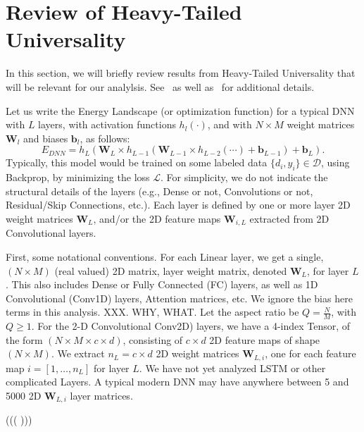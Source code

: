 
\section{Review of Heavy-Tailed Universality}
\label{sxn:theory-review}

In this section, we will briefly review results from Heavy-Tailed Universality that will be relevant for our analylsis.
See~\cite{SornetteBook,BouchaudPotters03} as well as~\cite{MM18_TR} for additional details.

Let us write the Energy Landscape (or optimization function) for a typical DNN with $L$ layers, with activation functions $h_{l}(\cdot)$, and with $N\times M$ weight matrices $\mathbf{W}_{l}$ and biases $\mathbf{b}_{l}$, as follows:
\begin{equation}
E_{DNN}=h_{L}(\mathbf{W}_{L}\times h_{L-1}(\mathbf{W}_{L-1}\times h_{L-2}(\cdots)+\mathbf{b}_{L-1})+\mathbf{b}_{L})  .
\label{eqn:dnn_energy}
\end{equation}
Typically, this model would be trained on some labeled data $\{d_{i},y_{i}\}\in\mathcal{D}$, using Backprop, by minimizing the loss $\mathcal{L}$.
For simplicity, we do not indicate the structural details of the layers (e.g., Dense or not, Convolutions or not, Residual/Skip Connections, etc.). 
Each layer is defined by one or more layer 2D weight matrices $\mathbf{W}_{L}$, and/or the 2D feature maps $\mathbf{W}_{i,L}$ extracted from 2D Convolutional layers.

First, some notational conventions.
For each Linear layer, we get a  single, $(N\times M)$ (real valued) 2D matrix, layer weight matrix, denoted $\mathbf{W}_{L}$, for layer $L$.  
This also includes Dense or Fully Connected (FC) layers, as well as 1D Convolutional (Conv1D) layers, Attention matrices, etc.
We ignore the bias here terms in this analysis. 
XXX.  WHY, WHAT.
Let the aspect ratio be $Q=\frac{N}{M}$, with $Q\ge 1$.
For the 2-D Convolutional Conv2D) layers, we have a 4-index Tensor, of the form $(N\times M \times c\times d)$, consisting
of $c\times d$ 2D feature maps of shape $(N\times M)$.    
We  extract $n_{L}=c\times d$  2D  weight matrices $\mathbf{W}_{L,i}$, one for each feature map $i=[1,\dots,n_{L}]$ for layer $L$.
We have not yet analyzed LSTM or other complicated Layers. 
A typical modern DNN may have anywhere between 5 and 5000 2D $\mathbf{W}_{L,i}$ layer matrices.
   
(((
)))



